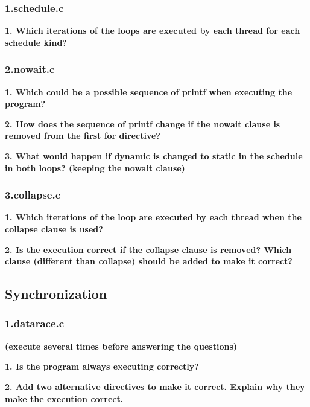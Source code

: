 \documentclass[12pt, a4paper]{article}
\begin{document}
\subsubsection{1.schedule.c}

\textbf{1. Which iterations of the loops are executed by each thread for each schedule kind?}

\subsubsection{2.nowait.c}

\textbf{1. Which could be a possible sequence of printf when executing the program?}

\hfill

\textbf{2. How does the sequence of printf change if the nowait clause is removed from the first for
directive?}

\hfill

\textbf{3. What would happen if dynamic is changed to static in the schedule in both loops? (keeping
the nowait clause)}

\subsubsection{3.collapse.c}

\textbf{1. Which iterations of the loop are executed by each thread when the collapse clause is used?}

\hfill

\textbf{2. Is the execution correct if the collapse clause is removed? Which clause (different than
collapse) should be added to make it correct?}

\subsection{Synchronization}

\subsubsection{1.datarace.c}

\textbf{(execute several times before answering the questions)}

\hfill

\textbf{1. Is the program always executing correctly?}

\hfill

\textbf{2. Add two alternative directives to make it correct. Explain why they make the execution
correct.}
\end{document}
